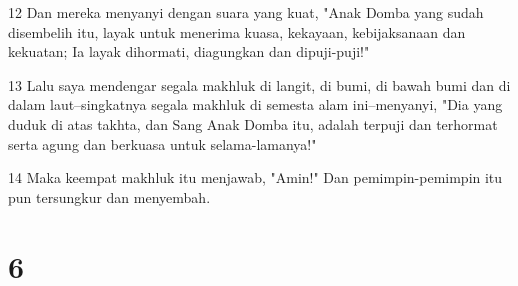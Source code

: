 \par 12 Dan mereka menyanyi dengan suara yang kuat, "Anak Domba yang sudah disembelih itu, layak untuk menerima kuasa, kekayaan, kebijaksanaan dan kekuatan; Ia layak dihormati, diagungkan dan dipuji-puji!"
\par 13 Lalu saya mendengar segala makhluk di langit, di bumi, di bawah bumi dan di dalam laut--singkatnya segala makhluk di semesta alam ini--menyanyi, "Dia yang duduk di atas takhta, dan Sang Anak Domba itu, adalah terpuji dan terhormat serta agung dan berkuasa untuk selama-lamanya!"
\par 14 Maka keempat makhluk itu menjawab, "Amin!" Dan pemimpin-pemimpin itu pun tersungkur dan menyembah.

\chapter{6}

